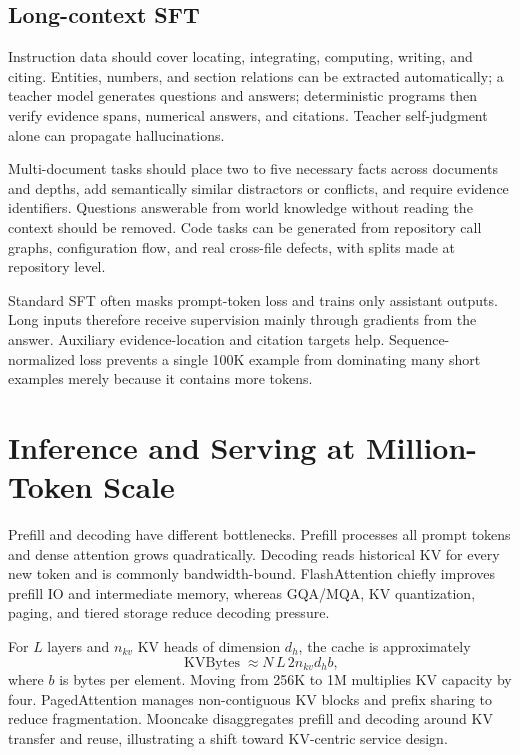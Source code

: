 \documentclass[UTF8,10pt,a4paper,fontset=none]{ctexart}
\begin{document}
\subsection{Long-context SFT}
Instruction data should cover locating, integrating, computing, writing, and citing. Entities, numbers, and section relations can be extracted automatically; a teacher model generates questions and answers; deterministic programs then verify evidence spans, numerical answers, and citations. Teacher self-judgment alone can propagate hallucinations.

Multi-document tasks should place two to five necessary facts across documents and depths, add semantically similar distractors or conflicts, and require evidence identifiers. Questions answerable from world knowledge without reading the context should be removed. Code tasks can be generated from repository call graphs, configuration flow, and real cross-file defects, with splits made at repository level.

Standard SFT often masks prompt-token loss and trains only assistant outputs. Long inputs therefore receive supervision mainly through gradients from the answer. Auxiliary evidence-location and citation targets help. Sequence-normalized loss prevents a single 100K example from dominating many short examples merely because it contains more tokens.

\section{Inference and Serving at Million-Token Scale}

Prefill and decoding have different bottlenecks. Prefill processes all prompt tokens and dense attention grows quadratically. Decoding reads historical KV for every new token and is commonly bandwidth-bound. FlashAttention chiefly improves prefill IO and intermediate memory, whereas GQA/MQA, KV quantization, paging, and tiered storage reduce decoding pressure.

For $L$ layers and $n_{kv}$ KV heads of dimension $d_h$, the cache is approximately
\begin{equation}
\operatorname{KVBytes}\approx N\,L\,2n_{kv}d_hb,
\end{equation}
where $b$ is bytes per element. Moving from 256K to 1M multiplies KV capacity by four. PagedAttention manages non-contiguous KV blocks and prefix sharing to reduce fragmentation\cite{kwon2023pagedattention}. Mooncake disaggregates prefill and decoding around KV transfer and reuse, illustrating a shift toward KV-centric service design\cite{qin2024moonlight}.
\end{document}
